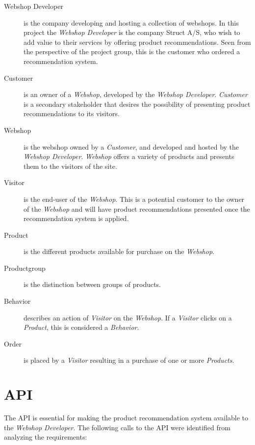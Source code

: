 \begin{description}
	\item[Webshop Developer] is the company developing and hosting a collection of webshops. In this project the \textit{Webshop Developer} is the company Struct A/S, who wish to add value to their services by offering product recommendations. Seen from the perspective of the project group, this is the customer who ordered a recommendation system.
	\item[Customer] is an owner of a \textit{Webshop}, developed by the \textit{Webshop Developer}. \textit{Customer} is a secondary stakeholder that desires the possibility of presenting product recommendations to its visitors.
	\item[Webshop] is the webshop owned by a \textit{Customer}, and developed and hosted by the \textit{Webshop Developer}. \textit{Webshop} offers a variety of products and presents them to the visitors of the site.
	\item[Visitor] is the end-user of the \textit{Webshop}. This is a potential customer to the owner of the \textit{Webshop} and will have product recommendations presented once the recommendation system is applied.
	\item[Product] is the different products available for purchase on the \textit{Webshop}. 
	\item[Productgroup] is the distinction between groups of products.
	\item[Behavior] describes an action of \textit{Visitor} on the \textit{Webshop}. If a \textit{Visitor} clicks on a \textit{Product}, this is considered a \textit{Behavior}. 
	\item[Order] is placed by a \textit{Visitor} resulting in a purchase of one or more \textit{Products}.
\end{description}

\section{API}
The API is essential for making the product recommendation system available to the \textit{Webshop Developer}. The following calls to the API were identified from analyzing the requirements:

